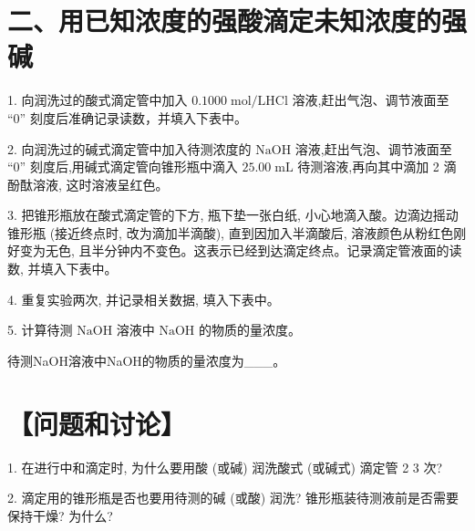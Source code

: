 \documentclass[10pt]{article}
\begin{document}
\section*{二、用已知浓度的强酸滴定未知浓度的强碱}

1. 向润洗过的酸式滴定管中加入 \({0.1000}\mathrm{\;{mol}}/\mathrm{L}\mathrm{{HCl}}\) 溶液,赶出气泡、调节液面至 “0” 刻度后准确记录读数，并填入下表中。

2. 向润洗过的碱式滴定管中加入待测浓度的 \(\mathrm{{NaOH}}\) 溶液,赶出气泡、调节液面至 “0” 刻度后,用碱式滴定管向锥形瓶中滴入 \({25.00}\mathrm{\;{mL}}\) 待测溶液,再向其中滴加 2 滴酚酞溶液, 这时溶液呈红色。

3. 把锥形瓶放在酸式滴定管的下方, 瓶下垫一张白纸, 小心地滴入酸。边滴边摇动锥形瓶 (接近终点时, 改为滴加半滴酸), 直到因加入半滴酸后, 溶液颜色从粉红色刚好变为无色, 且半分钟内不变色。这表示已经到达滴定终点。记录滴定管液面的读数, 并填入下表中。

4. 重复实验两次, 并记录相关数据, 填入下表中。

5. 计算待测 \(\mathrm{{NaOH}}\) 溶液中 \(\mathrm{{NaOH}}\) 的物质的量浓度。

\begin{center}
\end{center}

待测NaOH溶液中NaOH的物质的量浓度为\_\_\_。

\section*{【问题和讨论】}

1. 在进行中和滴定时, 为什么要用酸 (或碱) 润洗酸式 (或碱式) 滴定管 2 3 次?

2. 滴定用的锥形瓶是否也要用待测的碱 (或酸) 润洗? 锥形瓶装待测液前是否需要保持干燥? 为什么?
\end{document}
